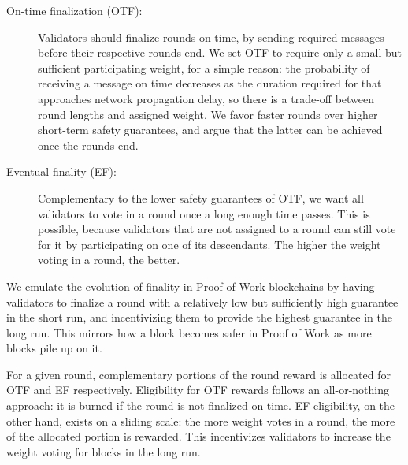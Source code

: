 \begin{description}
\item[On-time finalization (OTF):] Validators should finalize rounds on time, by sending required messages before their respective rounds end. We set OTF to require only a small but sufficient participating weight, for a simple reason: the probability of receiving a message on time decreases as the duration required for that approaches network propagation delay, so there is a trade-off between round lengths and assigned weight. We favor faster rounds over higher short-term safety guarantees, and argue that the latter can be achieved once the rounds end.
\item[Eventual finality (EF):] Complementary to the lower safety guarantees of OTF, we want all validators to vote in a round once a long enough time passes. This is possible, because validators that are not assigned to a round can still vote for it by participating on one of its descendants. The higher the weight voting in a round, the better.
\end{description}

We emulate the evolution of finality in Proof of Work blockchains by having validators to finalize a round with a relatively low but sufficiently high guarantee in the short run, and incentivizing them to provide the highest guarantee in the long run. This mirrors how a block becomes safer in Proof of Work as more blocks pile up on it.

For a given round, complementary portions of the round reward is allocated for OTF and EF respectively. Eligibility for OTF rewards follows an all-or-nothing approach: it is burned if the round is not finalized on time. EF eligibility, on the other hand, exists on a sliding scale: the more weight votes in a round, the more of the allocated portion is rewarded. This incentivizes validators to increase the weight voting for blocks in the long run.





